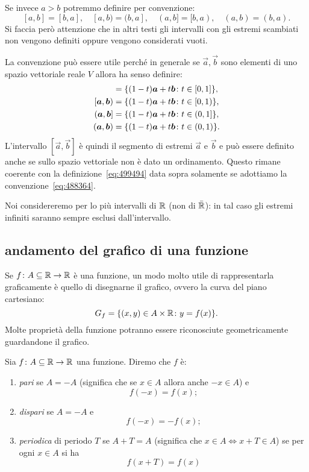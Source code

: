 Se invece $a>b$ potremmo definire per convenzione:
\begin{equation}\label{eq:488364}
  [a,b] = [b,a], \quad
  [a,b) = (b,a], \quad
  (a,b] = [b,a), \quad
  (a,b) = (b,a).
\end{equation}
Si faccia però attenzione che in altri testi gli intervalli con gli estremi
scambiati non vengono definiti oppure vengono considerati vuoti.

La convenzione può essere utile perché in generale se $\vec a, \vec b$ sono
elementi di uno spazio vettoriale reale $V$ allora ha senso
definire:
\begin{align*}
    [\vec a,\vec b] &= \ENCLOSE{(1-t)\vec a + t \vec b\colon t\in [0,1]},\\
    [\vec a,\vec b) &= \ENCLOSE{(1-t)\vec a + t \vec b\colon t\in [0,1)},\\
    (\vec a,\vec b] &= \ENCLOSE{(1-t)\vec a + t \vec b\colon t\in (0,1]},\\
    (\vec a,\vec b) &= \ENCLOSE{(1-t)\vec a + t \vec b\colon t\in (0,1)}.
\end{align*}
L'intervallo $[\vec a,\vec b]$ è quindi il segmento di estremi
$\vec a$ e $\vec b$ e può essere definito anche se sullo spazio
vettoriale non è dato un ordinamento.
Questo rimane coerente con la definizione~\eqref{eq:499494}
data sopra solamente se adottiamo la convenzione~\eqref{eq:488364}.

Noi considereremo per lo più intervalli di ${\mathbb R}$ (non di $\bar {{\mathbb R}}$): in tal
caso gli estremi infiniti saranno sempre esclusi dall'intervallo.

\subsection{andamento del grafico di una funzione}
%
Se $f\colon A \subseteq {\mathbb R}\to {\mathbb R}$ è una funzione, un modo molto
utile di rappresentarla graficamente è quello di disegnarne il
grafico, ovvero la curva del piano cartesiano:
\[
   G_f = {\left\{ (x,y)\in A\times {\mathbb R}\colon y = f(x) \right\}}.
\]
Molte proprietà della funzione potranno essere riconosciute
geometricamente guardandone il grafico.

\begin{definition}[simmetrie]
Sia $f\colon A \subseteq {\mathbb R} \to {\mathbb R}$ una funzione.
Diremo che $f$ è:
\begin{enumerate}
\item \emph{pari}%
%
%
se $A=-A$ (significa che se $x\in A$ allora anche $-x\in A$) e
\[
  f(-x) = f(x);
\]
\item \emph{dispari}%
%
%
se $A=-A$ e
\[
  f(-x) = -f(x);
\]
\item \emph{periodica}%
%
%
di periodo $T$ se $A+T=A$
(significa che $x\in A \iff x+T \in A$)
se per ogni $x\in A$ si ha
\[
  f(x+T)=f(x)
\]
\end{enumerate}
\end{definition}


